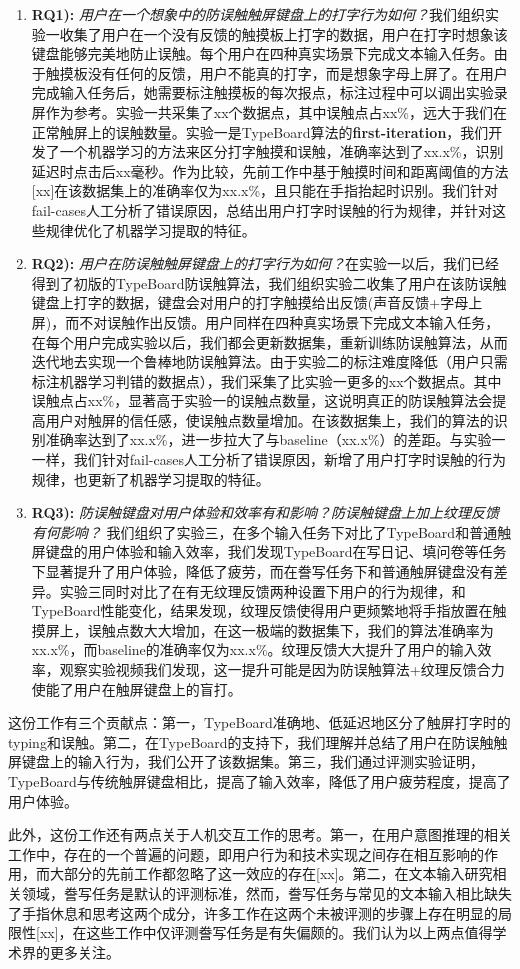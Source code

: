 \begin{enumerate}
	\item{\textbf{RQ1):} \emph{用户在一个想象中的防误触触屏键盘上的打字行为如何？}我们组织实验一收集了用户在一个没有反馈的触摸板上打字的数据，用户在打字时想象该键盘能够完美地防止误触。每个用户在四种真实场景下完成文本输入任务。由于触摸板没有任何的反馈，用户不能真的打字，而是想象字母上屏了。在用户完成输入任务后，她需要标注触摸板的每次报点，标注过程中可以调出实验录屏作为参考。实验一共采集了xx个数据点，其中误触点占xx\%，远大于我们在正常触屏上的误触数量。实验一是TypeBoard算法的\textbf{first-iteration}，我们开发了一个机器学习的方法来区分打字触摸和误触，准确率达到了xx.x\%，识别延迟时点击后xx毫秒。作为比较，先前工作中基于触摸时间和距离阈值的方法[xx]在该数据集上的准确率仅为xx.x\%，且只能在手指抬起时识别。我们针对fail-cases人工分析了错误原因，总结出用户打字时误触的行为规律，并针对这些规律优化了机器学习提取的特征。}
	\item{\textbf{RQ2):} \emph{用户在防误触触屏键盘上的打字行为如何？}在实验一以后，我们已经得到了初版的TypeBoard防误触算法，我们组织实验二收集了用户在该防误触键盘上打字的数据，键盘会对用户的打字触摸给出反馈(声音反馈+字母上屏)，而不对误触作出反馈。用户同样在四种真实场景下完成文本输入任务，在每个用户完成实验以后，我们都会更新数据集，重新训练防误触算法，从而迭代地去实现一个鲁棒地防误触算法。由于实验二的标注难度降低（用户只需标注机器学习判错的数据点），我们采集了比实验一更多的xx个数据点。其中误触点占xx\%，显著高于实验一的误触点数量，这说明真正的防误触算法会提高用户对触屏的信任感，使误触点数量增加。在该数据集上，我们的算法的识别准确率达到了xx.x\%，进一步拉大了与baseline（xx.x\%）的差距。与实验一一样，我们针对fail-cases人工分析了错误原因，新增了用户打字时误触的行为规律，也更新了机器学习提取的特征。}
	\item{\textbf{RQ3):} \emph{防误触键盘对用户体验和效率有和影响？防误触键盘上加上纹理反馈有何影响？} 我们组织了实验三，在多个输入任务下对比了TypeBoard和普通触屏键盘的用户体验和输入效率，我们发现TypeBoard在写日记、填问卷等任务下显著提升了用户体验，降低了疲劳，而在誊写任务下和普通触屏键盘没有差异。实验三同时对比了在有无纹理反馈两种设置下用户的行为规律，和TypeBoard性能变化，结果发现，纹理反馈使得用户更频繁地将手指放置在触摸屏上，误触点数大大增加，在这一极端的数据集下，我们的算法准确率为xx.x\%，而baseline的准确率仅为xx.x\%。纹理反馈大大提升了用户的输入效率，观察实验视频我们发现，这一提升可能是因为防误触算法+纹理反馈合力使能了用户在触屏键盘上的盲打。}
\end{enumerate}

这份工作有三个贡献点：第一，TypeBoard准确地、低延迟地区分了触屏打字时的typing和误触。第二，在TypeBoard的支持下，我们理解并总结了用户在防误触触屏键盘上的输入行为，我们公开了该数据集。第三，我们通过评测实验证明，TypeBoard与传统触屏键盘相比，提高了输入效率，降低了用户疲劳程度，提高了用户体验。

此外，这份工作还有两点关于人机交互工作的思考。第一，在用户意图推理的相关工作中，存在的一个普遍的问题，即用户行为和技术实现之间存在相互影响的作用，而大部分的先前工作都忽略了这一效应的存在[xx]。第二，在文本输入研究相关领域，誊写任务是默认的评测标准，然而，誊写任务与常见的文本输入相比缺失了手指休息和思考这两个成分，许多工作在这两个未被评测的步骤上存在明显的局限性[xx]，在这些工作中仅评测誊写任务是有失偏颇的。我们认为以上两点值得学术界的更多关注。
